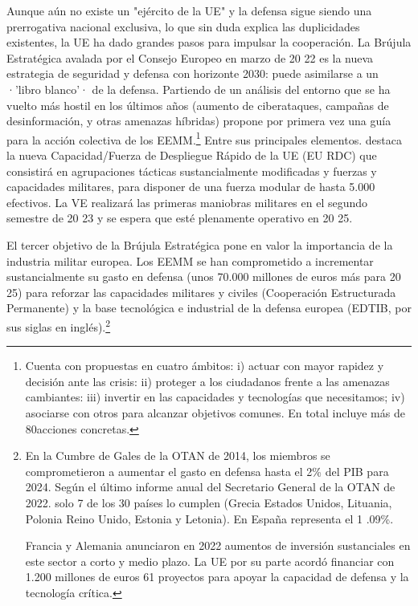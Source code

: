 \documentclass[10pt,a4paper]{article}
\begin{document}
Aunque aún no existe un "ejército de la UE" y la defensa sigue siendo una prerrogativa nacional exclusiva, lo que sin duda explica las duplicidades existentes, la UE ha dado grandes pasos para impulsar la cooperación. La Brújula Estratégica avalada por el Consejo Europeo en marzo de 20 22 es la nueva estrategia de seguridad y defensa con horizonte 2030: puede asimilarse a un ·'libro blanco'· de la defensa. Partiendo de un análisis del entorno que se ha vuelto más hostil en los últimos años (aumento de ciberataques, campañas de desinformación, y otras amenazas híbridas) propone por primera vez una guía para la acción colectiva de los EEMM.\footnote{%
    Cuenta con propuestas en cuatro ámbitos: i) actuar con mayor rapidez y decisión ante las crisis: ii) proteger a los ciudadanos frente a las amenazas cambiantes: iii) invertir en las capacidades y tecnologías que necesitamos; iv) asociarse con otros para alcanzar objetivos comunes. En total incluye más de 80acciones concretas.
} Entre sus principales elementos. destaca la nueva Capacidad/Fuerza de Despliegue Rápido de la UE (EU RDC) que consistirá en agrupaciones tácticas sustancialmente modificadas y fuerzas y capacidades militares, para disponer de una fuerza modular de hasta 5.000 efectivos. La VE realizará las primeras maniobras militares en el segundo semestre de 20 23 y se espera que esté plenamente operativo en 20 25.

El tercer objetivo de la Brújula Estratégica pone en valor la importancia de la industria militar europea. Los EEMM se han comprometido a incrementar sustancialmente su gasto en defensa (unos 70.000 millones de euros más para 20 25) para reforzar las capacidades militares y civiles (Cooperación Estructurada Permanente) y la base tecnológica e industrial de la defensa europea (EDTIB, por sus siglas en inglés).\footnote{%
    En la Cumbre de Gales de la OTAN de 2014, los miembros se comprometieron a aumentar el gasto en defensa hasta el 2\% del PIB para 2024. Según el último informe anual del Secretario General de la OTAN de 2022. solo 7 de los 30 países lo cumplen (Grecia Estados Unidos, Lituania, Polonia Reino Unido, Estonia y Letonia). En España representa el 1 .09\%.

Francia y Alemania anunciaron en 2022 aumentos de inversión sustanciales en este sector a corto y medio plazo. La UE por su parte acordó financiar con 1.200 millones de euros 61 proyectos para apoyar la capacidad de defensa y la tecnología crítica.
}
\end{document}
